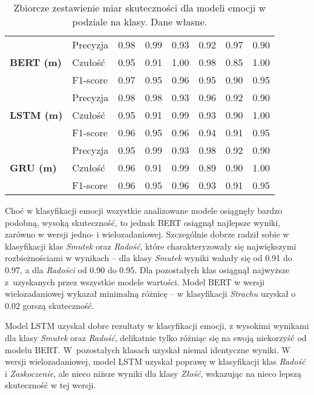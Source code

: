 \begin{table}[H]
\begin{tabular}{|l|l|c|c|c|c|c|c|}
\hline
\multirow{3}{*}{\textbf{BERT (m)}} 
& Precyzja & 0.98 & 0.99 & 0.93 & 0.92 & 0.97 & 0.90 \\
& Czułość  & 0.95 & 0.91 & 1.00 & 0.98 & 0.85 & 1.00 \\
& F1-score & \cellcolor{gray!20}0.97 & \cellcolor{gray!20}0.95 & \cellcolor{gray!20}0.96 & \cellcolor{gray!20}0.95 & \cellcolor{gray!20}0.90 & \cellcolor{gray!20}0.95 \\
\hline
\multirow{3}{*}{\textbf{LSTM (m)}} 
& Precyzja & 0.98 & 0.98 & 0.93 & 0.96 & 0.92 & 0.90 \\
& Czułość  & 0.95 & 0.91 & 0.99 & 0.93 & 0.90 & 1.00 \\
& F1-score & \cellcolor{gray!20}0.96 & \cellcolor{gray!20}0.95 & \cellcolor{gray!20}0.96 & \cellcolor{gray!20}0.94 & \cellcolor{gray!20}0.91 & \cellcolor{gray!20}0.95 \\
\hline
\multirow{3}{*}{\textbf{GRU (m)}} 
& Precyzja & 0.95 & 0.99 & 0.93 & 0.98 & 0.92 & 0.90 \\
& Czułość  & 0.96 & 0.91 & 0.99 & 0.89 & 0.90 & 1.00 \\
& F1-score & \cellcolor{gray!20}0.96 & \cellcolor{gray!20}0.95 & \cellcolor{gray!20}0.96 & \cellcolor{gray!20}0.93 & \cellcolor{gray!20}0.91 & \cellcolor{gray!20}0.95 \\
\hline
\end{tabular}
\caption{Zbiorcze zestawienie miar skuteczności dla modeli emocji w podziale na klasy. Dane własne.}
\label{tab:emotion_per_model}
\end{table}

Choć w klasyfikacji emocji wszystkie analizowane modele osiągnęły bardzo podobną, wysoką skuteczność, to jednak BERT osiągnął najlepsze wyniki, zarówno w wersji jedno- i wielozadaniowej. Szczególnie dobrze radził sobie w klasyfikacji klas \textit{Smutek} oraz \textit{Radość}, które charakteryzowały się największymi rozbieżnościami w wynikach – dla klasy \textit{Smutek} wyniki wahały się od 0.91 do 0.97, a dla \textit{Radości} od 0.90 do 0.95. Dla pozostałych klas osiągnął najwyższe z~uzyskanych przez wszystkie modele wartości. Model BERT w wersji wielozadaniowej wykazał minimalną różnicę – w klasyfikacji \textit{Strachu} uzyskał o 0.02 gorszą skuteczność.

Model LSTM uzyskał dobre rezultaty w klasyfikacji emocji, z wysokimi wynikami dla klasy \textit{Smutek} oraz \textit{Radość}, delikatnie tylko różniąc się na swoją niekorzyść od modelu BERT. W~pozostałych klasach uzyskał niemal identyczne wyniki. W wersji wielozadaniowej, model LSTM uzyskał poprawę w klasyfikacji klas \textit{Radość} i \textit{Zaskoczenie}, ale nieco niższe wyniki dla klasy \textit{Złość}, wskazując na nieco lepszą skuteczność w tej wersji.

